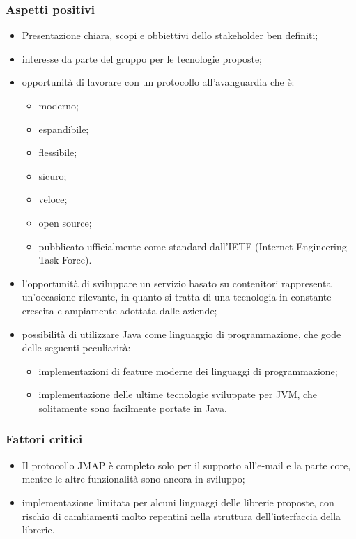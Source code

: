 	\subsubsection{Aspetti positivi}
		\begin{itemize}
			\item Presentazione chiara, scopi e obbiettivi dello stakeholder ben definiti;
			\item interesse da parte del gruppo per le tecnologie proposte;
			\item opportunità di lavorare con un protocollo all'avanguardia che è:
                \begin{itemize}
    				\item moderno;
                    \item espandibile;
                    \item flessibile;
    				\item sicuro;
    				\item veloce;
    				\item open source;
    				\item pubblicato ufficialmente come standard dall'IETF (Internet Engineering Task Force).
    			\end{itemize}
			\item l'opportunità di sviluppare un servizio basato su contenitori rappresenta un'occasione rilevante, in quanto si tratta di una tecnologia in constante crescita e ampiamente adottata dalle aziende;
			\item possibilità di utilizzare Java come linguaggio di programmazione, che gode delle seguenti peculiarità:
			\begin{itemize}
				\item implementazioni di feature moderne dei linguaggi di programmazione;
				\item implementazione delle ultime tecnologie sviluppate per JVM, che solitamente sono facilmente portate in Java.
			\end{itemize}
		\end{itemize}
		
	\subsubsection{Fattori critici}
		\begin{itemize}
			\item Il protocollo JMAP è completo solo per il supporto all'e-mail e la parte core, mentre le altre funzionalità sono ancora in sviluppo;
			\item implementazione limitata per alcuni linguaggi delle librerie proposte, con rischio di cambiamenti molto repentini nella struttura dell'interfaccia della librerie.
		\end{itemize}
		
